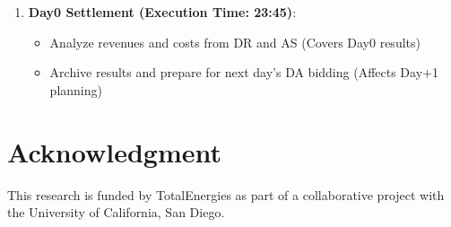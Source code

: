 \documentclass[conference]{IEEEtran}
\begin{document}
\begin{enumerate}
\begin{itemize}
        \item \textbf{00:15–23:45 (Repeated Every 15 min)}:
        \begin{itemize}
            \item Update forecasts with real-time measurements (e.g., SOC, EV sessions, PV) (Applies from current time step to 24:00)
            \item Run rolling MPC with updated market with SLR (Plan applies to 24:00)
            \item Submit RT market bid for 2 hours later interval (e.g., 02:15–02:30 at 00:15)
            \item Implement MPC outputs for current 15-min interval (Applies immediately)
        \end{itemize}

         \item \textbf{09:00 (Execution Time)}:
        \begin{itemize}
            \item Prepare Day+1 DA bidding as before \hfill (Plan valid for Day+1)
        \end{itemize}
    \end{itemize}
    
    \item \textbf{Day0 Settlement (Execution Time: 23:45)}:
    \begin{itemize}
        \item Analyze revenues and costs from DR and AS \hfill (Covers Day0 results)
        \item Archive results and prepare for next day’s DA bidding (Affects Day+1 planning)
    \end{itemize}
\end{enumerate}




\section*{Acknowledgment}
This research is funded by TotalEnergies as part of a collaborative project with the University of California, San Diego.



\printbibliography
\end{document}
